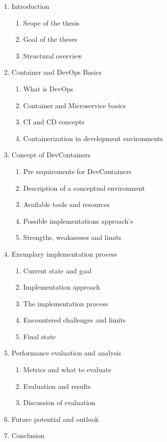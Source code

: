 \documentclass[12pt, a4paper]{article}
\begin{document}
\begin{enumerate}
    \item Introduction
    \begin{enumerate}
        \item Scope of the thesis
        \item Goal of the theses
        \item Structural overview
    \end{enumerate}
    \item Container and DevOps Basics
    \begin{enumerate}
        \item What is DevOps
        \item Container and Microservice basics
        \item \acl{CI} and \acl{CD} concepts
        \item Containerization in development environments
    \end{enumerate}
    \item Concept of DevContainers
    \begin{enumerate}
        \item Pre requirements for DevContainers
        \item Description of a conceptual environment
        \item Available tools and resources
        \item Possible implementations approach's
        \item Strengths, weaknesses and limits
    \end{enumerate}
    \item Exemplary implementation process
    \begin{enumerate}
        \item Current state and goal
        \item Implementation approach
        \item The implementation process
        \item Encountered challenges and limits
        \item Final state
    \end{enumerate}
    \item Performance evaluation and analysis
    \begin{enumerate}
        \item Metrics and what to evaluate
        \item Evaluation and results
        \item Discussion of evaluation
    \end{enumerate}
    \item Future potential and outlook
    \item Conclusion
\end{enumerate}
\end{document}
